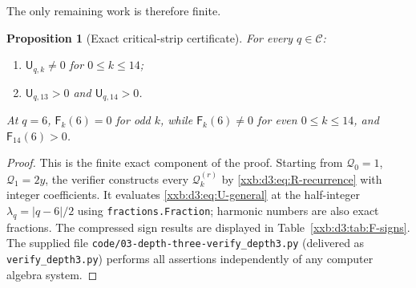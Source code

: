 \documentclass[11pt,a4paper]{article}
\numberwithin{equation}{section}
\newtheorem{proposition}[theorem]{Proposition}
\theoremstyle{definition}
\theoremstyle{remark}
\theoremstyle{plain}
\begin{document}
The only remaining work is therefore finite.

\begin{proposition}[Exact critical-strip certificate]
\label{xxb:d3:prop:finite-certificate}
For every $q\in\mathcal C$:
\begin{enumerate}[label=(\arabic*),nosep]
  \item $\mathsf U_{q,k}\neq0$ for $0\leq k\leq14$;
  \item $\mathsf U_{q,13}>0$ and $\mathsf U_{q,14}>0$.
\end{enumerate}
At $q=6$, $\mathsf F_k(6)=0$ for odd $k$, while $\mathsf F_k(6)\neq0$ for even
$0\leq k\leq14$, and $\mathsf F_{14}(6)>0$.
\end{proposition}

\begin{proof}
This is the finite exact component of the proof.  Starting from
$\mathcal Q_0=1$, $\mathcal Q_1=2y$, the verifier constructs every
$\mathcal Q_k^{(r)}$ by \eqref{xxb:d3:eq:R-recurrence} with integer
coefficients.  It evaluates \eqref{xxb:d3:eq:U-general} at the half-integer
$\lambda_q=|q-6|/2$ using \texttt{fractions.Fraction}; harmonic numbers are
also exact fractions.  The compressed sign results are displayed in
Table~\ref{xxb:d3:tab:F-signs}.  The supplied file
\texttt{code/03-depth-\allowbreak three-\allowbreak verify\_depth3.py}
(delivered as \texttt{verify\_\allowbreak depth3.py}) performs all assertions
independently of any computer algebra system.
\end{proof}
\end{document}
